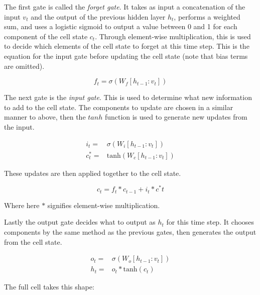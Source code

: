 \documentclass[bsc,singlespacing,logo, parskip, deptreport]{infthesis}
\begin{document}
The first gate is called the {\em forget gate}. It takes as input a concatenation of the input $v_t$ and the output of the previous hidden layer $h_t$, performs a weighted sum, and uses a logistic sigmoid to output a value between 0 and 1 for each component of the cell state $c_t$. Through element-wise multiplication, this is used to decide which elements of the cell state to forget at this time step. This is the equation for the input gate before updating the cell state (note that bias terms are omitted).

\begin{equation}
  \label{forget gate}
  f_t = \sigma (W_f [h_{t-1} : v_t])
\end{equation}

The next gate is the {\em input gate}. This is used to determine what new information to add to the cell state. The components to update are chosen in a similar manner to above, then the $tanh$ function is used to generate new updates from the input.

\begin{align}
  \label{input gate}
  i_t =& \sigma (W_i [h_{t-1} : v_t]) \\
  c^*_t =& \mathrm{tanh} (W_c [h_{t-1} : v_t])
\end{align}

These updates are then applied together to the cell state.

\begin{equation}
  \label{update cell}
  c_t = f_t * c_{t-1} + i_t * c^*t
\end{equation}

Where here $*$ signifies element-wise multiplication.

Lastly the output gate decides what to output as $h_t$ for this time step. It chooses components by the same method as the previous gates, then generates the output from the cell state.

\begin{align}
  \label{output gate}
  o_t =& \sigma (W_o [h_{t-1} : v_t]) \\
  h_t =& o_t * \mathrm{tanh}(c_t)
\end{align}

The full cell takes this shape:
\end{document}

